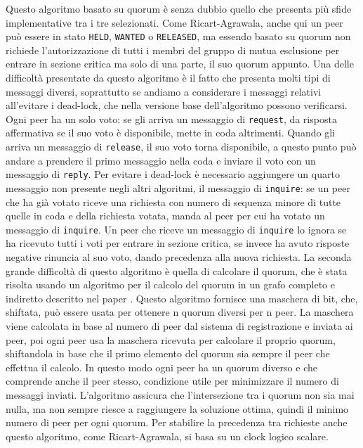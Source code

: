 \documentclass[conference]{IEEEtran}
\begin{document}
Questo algoritmo basato su quorum è senza dubbio quello che presenta più sfide implementative tra i tre selezionati. Come Ricart-Agrawala, anche qui un peer può essere in stato \verb|HELD|, \verb|WANTED| o \verb|RELEASED|, ma essendo basato su quorum non richiede l'autorizzazione di tutti i membri del gruppo di mutua esclusione per entrare in sezione critica ma solo di una parte, il suo quorum appunto. Una delle difficoltà presentate da questo algoritmo è il fatto che presenta molti tipi di messaggi diversi, soprattutto se andiamo a considerare i messaggi relativi all'evitare i dead-lock, che nella versione base dell'algoritmo possono verificarsi. Ogni peer ha un solo voto: se gli arriva un messaggio di \verb|request|, da risposta affermativa se il suo voto è disponibile, mette in coda altrimenti. Quando gli arriva un messaggio di \verb|release|, il suo voto torna disponibile, a questo punto può andare a prendere il primo messaggio nella coda e inviare il voto con un messaggio di \verb|reply|. Per evitare i dead-lock è necessario aggiungere un quarto messaggio non presente negli altri algoritmi, il messaggio di \verb|inquire|: se un peer che ha già votato riceve una richiesta con numero di sequenza minore di tutte quelle in coda e della richiesta votata, manda al peer per cui ha votato un messaggio di \verb|inquire|. Un peer che riceve un messaggio di \verb|inquire| lo ignora se ha ricevuto tutti i voti per entrare in sezione critica, se invece ha avuto risposte negative rinuncia al suo voto, dando precedenza alla nuova richiesta. La seconda grande difficoltà di questo algoritmo è quella di calcolare il quorum, che è stata risolta usando un algoritmo per il calcolo del quorum in un grafo completo e indiretto descritto nel paper \cite{b1}. Questo algoritmo fornisce una maschera di bit, che, shiftata, può essere usata per ottenere n quorum diversi per n peer. La maschera viene calcolata in base al numero di peer dal sistema di registrazione e inviata ai peer, poi ogni peer usa la maschera ricevuta per calcolare il proprio quorum, shiftandola in base che il primo elemento del quorum sia sempre il peer che effettua il calcolo. In questo modo ogni peer ha un quorum diverso e che comprende anche il peer stesso, condizione utile per minimizzare il numero di messaggi inviati. L'algoritmo assicura che l'intersezione tra i quorum non sia mai nulla, ma non sempre riesce a raggiungere la soluzione ottima, quindi il minimo numero di peer per ogni quorum. Per stabilire la precedenza tra richieste anche questo algoritmo, come Ricart-Agrawala, si basa su un clock logico scalare.
\end{document}
